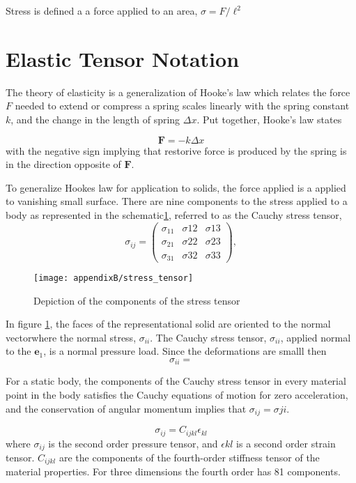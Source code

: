 Stress is defined a a force applied to an area, $\sigma = F/\ell^2$

\section{Elastic Tensor Notation}

The theory of elasticity is a generalization of Hooke's law which relates the force $F$ needed to extend or compress a spring scales linearly with the spring constant  $k$, and the change in the length of spring $\Delta x$.  Put together, Hooke's law states

\begin{equation}\label{eq:hooke_law}
    \bm{F} = -k \Delta x
\end{equation}
with the negative sign implying that restorive force is produced by the spring is in the direction opposite of $\bm{F}$.


To generalize Hookes law for application to solids, the force applied is a applied to vanishing small surface. There are nine components to the stress applied to a body as represented in the schematic\ref{fig:stress_tensor}, referred to as the Cauchy stress tensor\cite{timeshenko1970_elasticity},
\begin{equation}
  \sigma_{ij}
  =
  \begin{pmatrix}
    \sigma_{11} & \sigma{12} & \sigma{13} \\
    \sigma_{21} & \sigma{22} & \sigma{23} \\
    \sigma_{31} & \sigma{32} & \sigma{33}
  \end{pmatrix},
\end{equation}

\begin{figure}[h]
  \texttt{[image: appendixB/stress\_tensor]}
  \caption{Depiction of the components of the stress tensor}
  \label{fig:stress_tensor}
  \centering
\end{figure}

In figure \ref{fig:stress_tensor}, the faces of the representational solid are oriented to the normal vectorwhere the normal stress, $\sigma_{ii}$.  The Cauchy stress tensor, $\sigma_{ii}$, applied normal to the $\bm{e}_1$, is a normal pressure load.  Since the deformations are smalll then
\begin{equation}
  \sigma_{ii}=
\end{equation}

For a static body, the components of the Cauchy stress tensor in every material point in the body satisfies the Cauchy equations of motion for zero acceleration\cite{timeshenko1970_elasticity}, and the conservation of angular momentum implies that $\sigma_{ij}=\sigma{ji}$.

\begin{equation}
  \sigma_{ij} = C_{ijkl}\epsilon_{kl}
\end{equation}
where $\sigma_{ij}$ is the second order pressure tensor, and $\epsilon{kl}$ is a second order strain tensor.
$C_{ijkl}$ are the components of the fourth-order stiffness tensor of the material properties.  For three dimensions the fourth order has 81 components.
